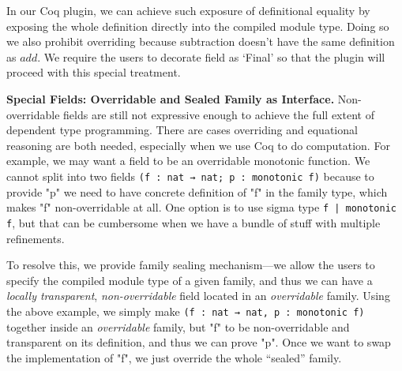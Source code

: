 In our Coq plugin, we can achieve such exposure of definitional equality by
exposing the whole definition directly into the compiled module type. Doing so we also prohibit overriding because
subtraction doesn't have the same definition as $add$. We require the
users to decorate field as `Final' so that the plugin will proceed with
this special treatment.

\textbf{Special Fields: Overridable and Sealed Family as Interface.} 
Non-overridable fields are still not expressive enough to achieve the full
extent of dependent type programming. There are cases overriding and
equational reasoning are both needed, especially when we use Coq to do
computation. For example, we may want a field to be an overridable 
monotonic function. We cannot split into two fields
\texttt{(f : nat → nat; p : monotonic f)} because to provide
"p" we need to have concrete definition of "f" in the family type, which
makes "f" non-overridable at all. One option is to use sigma type
\texttt{{f | monotonic f}}, but that can be cumbersome when we have
a bundle of stuff with multiple refinements. 

To resolve this, we provide family sealing mechanism---we allow the
users to specify the compiled module type of a given family, and thus we can have a
\textit{locally transparent}, \textit{non-overridable} field located in
an \textit{overridable} family. Using the above example, we simply make
\texttt{(f : nat → nat, p : monotonic f)} together inside an
\textit{overridable} family, but "f" to be non-overridable and
transparent on its definition, and thus we can prove "p". Once we want
to swap the implementation of "f", we just override the whole ``sealed''
family.

